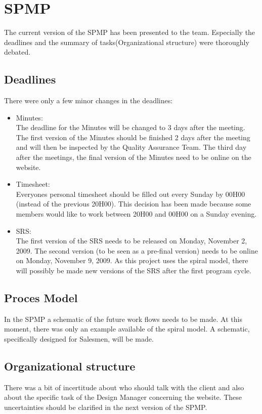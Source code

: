 \documentclass[a4paper, 12pt]{article}
\begin{document}
	\section{SPMP}
The current version of the SPMP has been presented to the team. Especially the deadlines and the summary of tasks(Organizational structure) were thoroughly debated. 
	 \subsection{Deadlines}
There were only a few minor changes in the deadlines:
	\begin{itemize}
		\item Minutes:\\
The deadline for the Minutes will be changed to 3 days after the meeting. The first version of the Minutes should be finished 2 days after the meeting and will then be inspected by the Quality Assurance Team. The third day after the meetings, the final version of the Minutes need to be online on the website.
		\item Timesheet:\\
Everyones personal timesheet should be filled out every Sunday by 00H00 (instead of the previous 20H00). This decision has been made because some members would like to work between 20H00 and 00H00 on a Sunday evening.
		\item SRS:\\
The first version of the SRS needs to be released on Monday, November 2, 2009. The second version (to be seen as a pre-final version) needs to be online on Monday, November 9, 2009. As this project uses the spiral model, there will possibly be made new versions of the SRS after the first program cycle.
	\end{itemize}	
	\subsection{Proces Model}
In the SPMP a schematic of the future work flows needs to be made. At this moment, there was only an example available of the spiral model. A schematic, specifically designed for Salesmen, will be made.
	\subsection{Organizational structure}
There was a bit of incertitude about who should talk with the client and also about the specific task of the Design Manager concerning the website. These uncertainties should be clarified in the next version of the SPMP.
\end{document}
